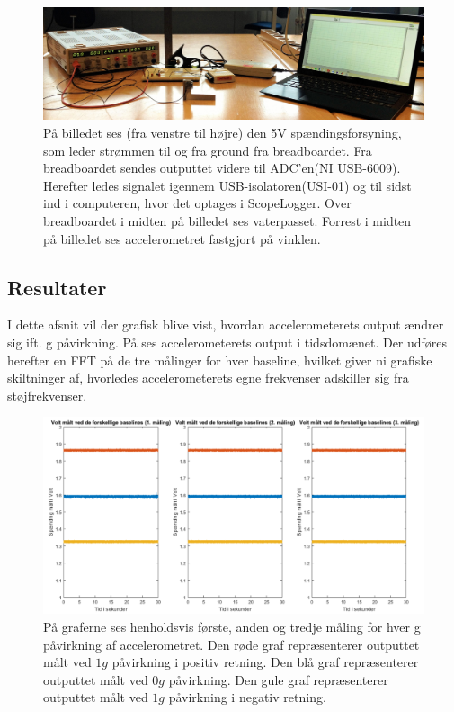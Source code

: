 \begin{figure}[H]
	\centering
	\includegraphics[scale=0.14]{figures/cProblemloesning/Pilotforsoeg1_2.jpg}
	\caption{På billedet ses (fra venstre til højre) den 5V spændingsforsyning, som leder strømmen til og fra ground fra breadboardet. Fra breadboardet sendes outputtet videre til ADC'en(NI USB-6009). Herefter ledes signalet igennem USB-isolatoren(USI-01) og til sidst ind i computeren, hvor det optages i ScopeLogger. Over breadboardet i midten på billedet ses vaterpasset. Forrest i midten på billedet ses accelerometret fastgjort på vinklen.}
	\label{pforsoeg2}
\end{figure}

\subsection{Resultater}\label{Sec_Pilot_Data}
I dette afsnit vil der grafisk blive vist, hvordan accelerometerets output ændrer sig ift. g påvirkning. På  ses accelerometerets output i tidsdomænet. Der udføres herefter en FFT på de tre målinger for hver baseline, hvilket giver ni grafiske skiltninger af, hvorledes accelerometerets egne frekvenser adskiller sig fra støjfrekvenser.

\begin{figure}[H]
	\centering
	\includegraphics[scale=0.45]{figures/cProblemloesning/Pilotforsoeg_Tid.png}
	\caption{På graferne ses henholdsvis første, anden og tredje måling for hver g påvirkning af accelerometret. Den røde graf repræsenterer outputtet målt ved $1g$ påvirkning i positiv retning. Den blå graf repræsenterer outputtet målt ved $0g$ påvirkning. Den gule graf repræsenterer outputtet målt ved $1g$ påvirkning i negativ retning.}
	\label{Fig:Pilot_Tid}
\end{figure}

